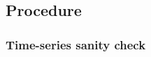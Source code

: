 \subsection{Procedure}\label{sec:results:data-analysis:procedure}

\subsubsection{Time-series sanity check}

